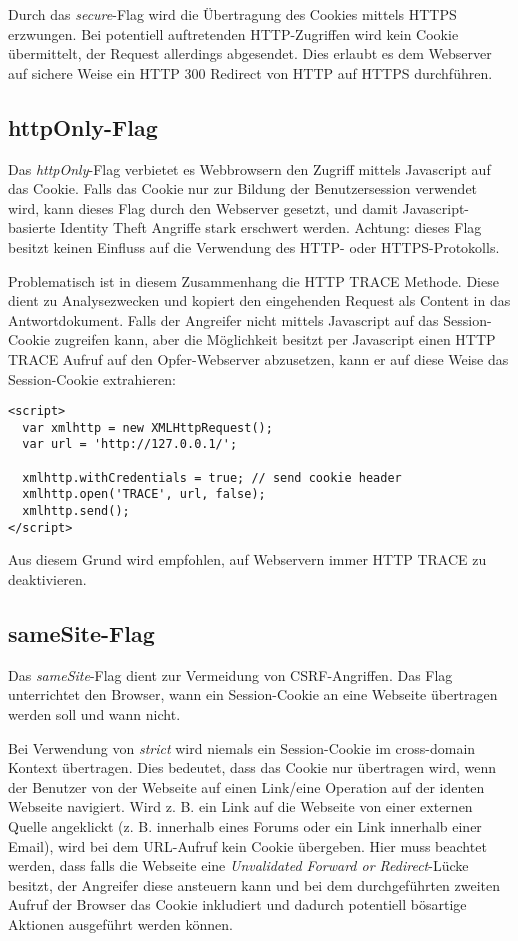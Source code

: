 Durch das \textit{secure}-Flag wird die Übertragung des Cookies mittels HTTPS erzwungen. Bei potentiell auftretenden HTTP-Zugriffen wird kein Cookie übermittelt, der Request allerdings abgesendet. Dies erlaubt es dem Webserver auf sichere Weise ein HTTP 300 Redirect von HTTP auf HTTPS durchführen.

\subsection{httpOnly-Flag}

Das \textit{httpOnly}-Flag verbietet es Webbrowsern den Zugriff mittels Javascript auf das Cookie. Falls das Cookie nur zur Bildung der Benutzersession verwendet wird, kann dieses Flag durch den Webserver gesetzt, und damit Javascript-basierte Identity Theft Angriffe stark erschwert werden. Achtung: dieses Flag besitzt keinen Einfluss auf die Verwendung des HTTP- oder HTTPS-Protokolls.

Problematisch ist in diesem Zusammenhang die HTTP TRACE Methode. Diese dient zu Analysezwecken und kopiert den eingehenden Request als Content in das Antwortdokument. Falls der Angreifer nicht mittels Javascript auf das Session-Cookie zugreifen kann, aber die Möglichkeit besitzt per Javascript einen HTTP TRACE Aufruf auf den Opfer-Webserver abzusetzen, kann er auf diese Weise das Session-Cookie extrahieren:

\begin{verbatim}
<script>
  var xmlhttp = new XMLHttpRequest();
  var url = 'http://127.0.0.1/';

  xmlhttp.withCredentials = true; // send cookie header
  xmlhttp.open('TRACE', url, false);
  xmlhttp.send();
</script>
\end{verbatim}

Aus diesem Grund wird empfohlen, auf Webservern immer HTTP TRACE zu deaktivieren.

\subsection{sameSite-Flag}
\label{session_cookies_samesite}

Das \textit{sameSite}-Flag dient zur Vermeidung von CSRF-Angriffen. Das Flag unterrichtet den Browser, wann ein Session-Cookie an eine Webseite übertragen werden soll und wann nicht.

Bei Verwendung von \textit{strict} wird niemals ein Session-Cookie im cross-domain Kontext übertragen. Dies bedeutet, dass das Cookie nur übertragen wird, wenn der Benutzer von der Webseite auf einen Link/eine Operation auf der identen Webseite navigiert. Wird z. B. ein Link auf die Webseite von einer externen Quelle angeklickt (z. B. innerhalb eines Forums oder ein Link innerhalb einer Email), wird bei dem URL-Aufruf kein Cookie übergeben. Hier muss beachtet werden, dass falls die Webseite eine \textit{Unvalidated Forward or Redirect}-Lücke besitzt, der Angreifer diese ansteuern kann und bei dem durchgeführten zweiten Aufruf der Browser das Cookie inkludiert und dadurch potentiell bösartige Aktionen ausgeführt werden können.

